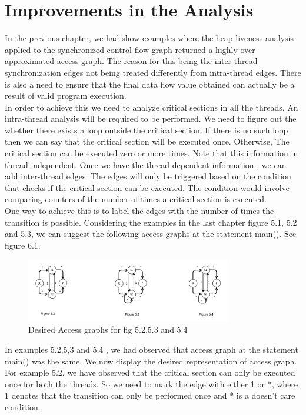 \chapter{Improvements in the Analysis}

In the previous chapter, we had show examples where the heap liveness analysis applied to the synchronized control flow graph returned a highly-over approximated access graph. The reason for this being the inter-thread synchronization edges not being treated differently from intra-thread edges. There is also a need to ensure that the final data flow value obtained can actually be a result of valid program execution. \\

In order to achieve this we need to analyze critical sections in all the threads. An intra-thread analysis will be required to be performed. We need to figure out the whether there exists a loop outside the critical section. If there is no such loop then we can say that the critical section will be executed once. Otherwise, The critical section can be executed zero or more times. Note that this information in thread independent. Once we have the thread dependent information , we can add inter-thread edges. The edges will only be triggered based on the condition that checks if the critical section can be executed. The condition would involve comparing counters of the number of times a critical section is executed. \\

One way to achieve this is to label the edges with the number of times the transition is possible. Considering the examples in the last chapter figure 5.1, 5.2 and 5.3, we can suggest the following access graphs at the statement main(). See figure 6.1. \\


\begin{figure}
	\centering
	\includegraphics[width=0.8\textwidth]{Figures/access_graph_rep.png}
	\caption{Desired Access graphs for fig 5.2,5.3 and 5.4}
	\label{fig:ch5example}
\end{figure}
 
In examples 5.2,5,3 and 5.4 , we had observed that access graph at the statement main() was the same. We now display the desired representation of access graph. For example 5.2, we have observed that the critical section can only be executed once for both the threads. So we need to mark the edge with either 1 or *, where 1 denotes that the transition can only be performed once and * is a doesn't care condition. \\

